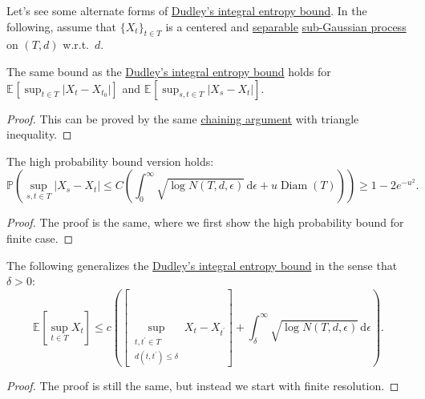 Let's see some alternate forms of \hyperref[col:Dudley-integral-entropy-bound]{Dudley's integral entropy bound}. In the following, assume that \(\{ X_t \} _{t\in T}\) is a centered and \hyperref[def:separable]{separable} \hyperref[def:sub-Gaussian-process]{sub-Gaussian process} on \((T, d)\) w.r.t.\ \(d\).

\begin{corollary}\label{col:Dudley-integral-entropy-bound-difference}
	The same bound as the \hyperref[col:Dudley-integral-entropy-bound]{Dudley's integral entropy bound} holds for \(\mathbb{E}_{}\left[\sup _{t\in T} \vert X_t - X_{t_0} \vert \right]\) and \(\mathbb{E}_{}\left[\sup _{s, t\in T} \vert X_s - X_t \vert \right]\).
\end{corollary}
\begin{proof}
	This can be proved by the same \hyperref[note:chaining]{chaining argument} with triangle inequality.
\end{proof}

\begin{corollary}\label{col:Dudley-integral-entropy-bound-hp}
	The high probability bound version holds:
	\[
		\mathbb{P} \left(
		\sup _{s, t\in T} \vert X_s - X_t \vert
		\leq C \left( \int_{0}^{\infty} \sqrt{\log N(T, d, \epsilon )}  \,\mathrm{d}\epsilon + u \mathop{\mathrm{Diam}}(T) \right)
		\right) \geq 1 - 2 e^{-u^2}.
	\]
\end{corollary}
\begin{proof}
	The proof is the same, where we first show the high probability bound for finite case.
\end{proof}

\begin{corollary}\label{col:Dudley-integral-entropy-bound-finite-resolution}
	The following generalizes the \hyperref[col:Dudley-integral-entropy-bound]{Dudley's integral entropy bound} in the sense that \(\delta > 0\):
	\[
		\mathbb{E}_{}\left[\sup _{t\in T} X_t \right] \leq c \left( \left[ \sup _{\substack{t, t^{\prime} \in T \\ d(t, t^{\prime} ) \leq \delta }} X_t - X_{t^{\prime} } \right] + \int_{\delta }^{\infty} \sqrt{\log N(T, d, \epsilon )}  \,\mathrm{d}\epsilon \right) .
	\]
\end{corollary}
\begin{proof}
	The proof is still the same, but instead we start with finite resolution.
\end{proof}

